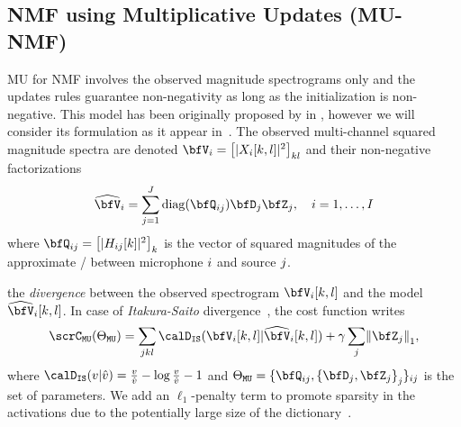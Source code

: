\subsection{NMF using Multiplicative Updates (MU-NMF)}\label{sec:separake:mu}
\ac{MU} for \ac{NMF} involves the observed magnitude spectrograms only and the updates rules guarantee non-negativity as long as the initialization is non-negative.
This model has been originally proposed by in , however we will consider its formulation as it appear in~.
The observed multi-channel squared magnitude spectra are denoted $\mV_\idxMic = \klist{\powerOf{\MIC_\idxMic[k,l]}}_{kl}$ and their non-negative factorizations
\begin{equation}
    \label{eq:mu_nmf}
    \wh{\mV}_\idxMic = \sum_{\idxSrc=1}^{\numSrcs} \diag(\vQ_{\idxMicSrc}) \mD_\idxSrc \mZ_\idxSrc , \quad \idxMic=1,\ldots,\numMics
\end{equation}
where $\vQ_{\idxMicSrc} = \klist{\powerOf{\FLT_{\idxMicSrc}[k]}}_k$ is the vector of squared magnitudes of the approximate \RTF/ between microphone $i$ and source $j$.

 the  \textit{divergence} between the observed spectrogram $\mV_{\idxMic}[k,l]$ and the model $\wh{\mV}_{\idxMic}[k,l]$.
In case of \textit{Itakura-Saito} divergence~, the cost function writes
\begin{equation}
    \scrC_{\mathtt{MU}}(\Theta_{\mathtt{MU}}) = \sum_{\idxSrc k l} \calD_{\mathtt{IS}}(\mV_{\idxMic}[k,l] | \wh{\mV}_{\idxMic}[k,l])
    + \gamma \sum_\idxSrc \kvvbar{\mZ_\idxSrc}_1,
\end{equation}
where $\calD_{\mathtt{IS}}( v | \hat{v} ) = \frac{v}{\hat{v}} - \log \frac{v}{\hat{v}} - 1$ and $\Theta_{\mathtt{MU}} = \{\vQ_{\idxMicSrc}, \set{\mD_\idxSrc, \mZ_\idxSrc}_\idxSrc\}_{\idxMicSrc}$ is the set of parameters.
We add an $\ell_1$-penalty term to promote sparsity in the activations due to the potentially large size of the dictionary~.

